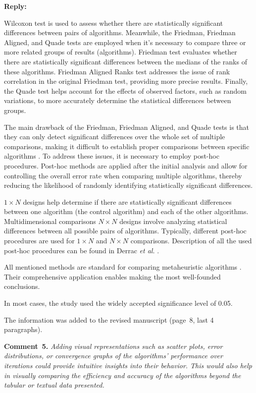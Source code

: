 \documentclass[a4paper,fleqn]{cas-sc}
\begin{document}
\noindent
\textcolor[rgb]{0.51,0.00,0.00}{\textbf{Reply:}}

Wilcoxon test is used to assess whether there are statistically significant differences between pairs of algorithms.
Meanwhile, the Friedman, Friedman Aligned, and Quade tests are employed when it's necessary to compare three or more related groups of results (algorithms).
Friedman test evaluates whether there are statistically significant differences between the medians of the ranks of these algorithms.
Friedman Aligned Ranks test addresses the issue of rank correlation in the original Friedman test, providing more precise results.
Finally, the Quade test helps account for the effects of observed factors, such as random variations,
to more accurately determine the statistical differences between groups.

The main drawback of the Friedman, Friedman Aligned, and Quade tests is that
they can only detect significant differences over the whole set of multiple comparisons,
making it difficult to establish proper comparisons between specific algorithms \cite{Derrac2011}.
To address these issues, it is necessary to employ post-hoc procedures.
Post-hoc methods are applied after the initial analysis and allow for controlling the overall error rate
when comparing multiple algorithms, thereby reducing the likelihood of randomly identifying statistically significant differences.

$1\times N$ designs help determine if there are statistically significant differences between one algorithm
(the control algorithm) and each of the other algorithms.
Multidimensional comparisons $N\times N$ designs involve analyzing statistical differences between all possible pairs of algorithms.
Typically, different post-hoc procedures are used for $1\times N$ and $N\times N$ comparisons.
Description of all the used post-hoc procedures can be found in Derrac \emph{et al.} \cite{Derrac2011}.

All mentioned methods are standard for comparing metaheuristic algorithms \cite{Derrac2011}.
Their comprehensive application enables making the most well-founded conclusions.

In most cases, the study used the widely accepted significance level of 0.05.

The information was added to the revised manuscript (page~8, last 4 paragraphs).



\vspace{1cm}
\noindent
\textcolor[rgb]{0.00,0.50,1.00}{\textbf{Comment~5.}}
\emph{ Adding visual representations such as scatter plots, error distributions,
or convergence graphs of the algorithms' performance over iterations could provide intuitive insights into their behavior.
This would also help in visually comparing the efficiency and accuracy of the algorithms beyond the tabular or textual data presented.}
\end{document}

